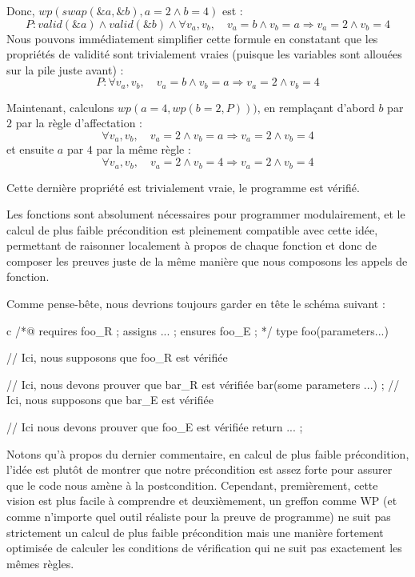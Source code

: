 Donc, $wp(swap(\&a, \&b), a = 2 \wedge b = 4)$ est :
$$P: valid(\&a) \wedge valid(\&b) \wedge \forall v_a, v_b, \quad v_a = b \wedge v_b = a \Rightarrow v_a = 2 \wedge v_b = 4$$
Nous pouvons immédiatement simplifier cette formule en constatant que les propriétés
de validité sont trivialement vraies (puisque les variables sont allouées sur la pile
juste avant) :
$$P: \forall v_a, v_b, \quad v_a = b \wedge v_b = a \Rightarrow v_a = 2 \wedge v_b = 4$$


Maintenant, calculons $wp(a = 4, wp(b = 2, P)))$, en remplaçant d'abord $b$
par $2$ par la règle d'affectation :
$$\forall v_a, v_b, \quad v_a = 2 \wedge v_b = a \Rightarrow v_a = 2 \wedge v_b = 4$$
et ensuite $a$ par $4$ par la même règle :
$$\forall v_a, v_b, \quad v_a = 2 \wedge v_b = 4 \Rightarrow v_a = 2 \wedge v_b = 4$$


Cette dernière propriété est trivialement vraie, le programme est vérifié.




Les fonctions sont absolument nécessaires pour programmer modulairement, et le calcul
de plus faible précondition est pleinement compatible avec cette idée, permettant de
raisonner localement à propos de chaque fonction et donc de composer les preuves juste
de la même manière que nous composons les appels de fonction.


Comme pense-bête, nous devrions toujours garder en tête le schéma suivant :


\begin{CodeBlock}{c}
/*@
  requires foo_R ;
  assigns ... ;
  ensures foo_E ;
*/
type foo(parameters...){
  // Ici, nous supposons que foo_R est vérifiée


  // Ici, nous devons prouver que bar_R est vérifiée
  bar(some parameters ...) ;
  // Ici, nous supposons que bar_E est vérifiée


  // Ici nous devons prouver que foo_E est vérifiée
  return ... ;
}
\end{CodeBlock}


Notons qu'à propos du dernier commentaire, en calcul de plus faible précondition,
l'idée est plutôt de montrer que notre précondition est assez forte pour assurer
que le code nous amène à la postcondition. Cependant, premièrement, cette vision
est plus facile à comprendre et deuxièmement, un greffon comme WP (et comme n'importe
quel outil réaliste pour la preuve de programme) ne suit pas strictement un calcul
de plus faible précondition mais une manière fortement optimisée de calculer les
conditions de vérification qui ne suit pas exactement les mêmes règles.


